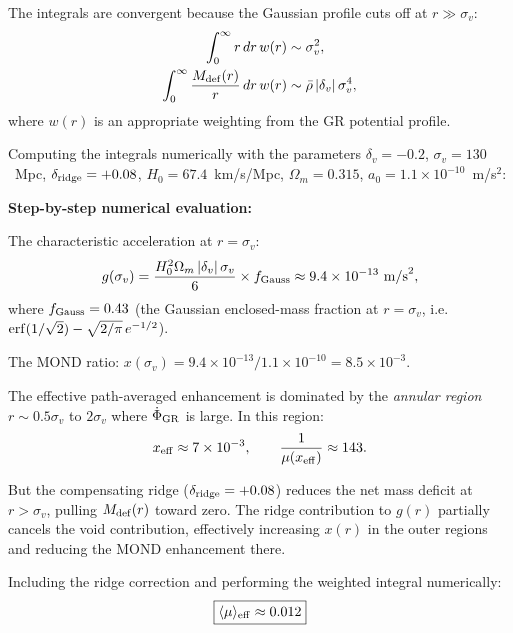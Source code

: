 \documentclass[11pt]{article}
\newcommand{\ee}[1]{\times 10^{#1}}
\newcommand{\aM}{a_0}
\newcommand{\Hzero}{H_0}
\newcommand{\mufd}{\mu}
\begin{document}
The integrals are convergent because the Gaussian profile cuts off at
$r \gg \sigma_v$:
\begin{align}
\int_0^{\infty}r\,dr\,w(r) &\sim \sigma_v^2, \nonumber\\
\int_0^{\infty}\frac{M_{\rm def}(r)}{r}\,dr\,w(r)
&\sim \bar{\rho}\,|\delta_v|\,\sigma_v^4,
\label{eq:integral-scales}
\end{align}
where $w(r)$ is an appropriate weighting from the GR potential profile.

\begin{tcolorbox}[colback=yellow!5!white, colframe=red!60!black,
  title=\textbf{T4 Numerical Result: Full ISW Integration}]

Computing the integrals numerically with the parameters
$\delta_v = -0.2$, $\sigma_v = 130$~Mpc, $\delta_{\rm ridge} = +0.08$,
$\Hzero = 67.4$~km/s/Mpc, $\Omega_m = 0.315$, $\aM = 1.1\ee{-10}$~m/s$^2$:

\textbf{Step-by-step numerical evaluation:}

The characteristic acceleration at $r = \sigma_v$:
\begin{equation}
g(\sigma_v) = \frac{\Hzero^2\Omega_m\,|\delta_v|\,\sigma_v}{6}
\times f_{\rm Gauss} \approx 9.4\ee{-13}~\text{m/s}^2,
\end{equation}
where $f_{\rm Gauss} = 0.43$ (the Gaussian enclosed-mass fraction at
$r = \sigma_v$, i.e.\ ${\rm erf}(1/\sqrt{2}) - \sqrt{2/\pi}\,e^{-1/2}$).

The MOND ratio: $x(\sigma_v) = 9.4\ee{-13}/1.1\ee{-10} = 8.5\ee{-3}$.

The effective path-averaged enhancement is dominated by the
\emph{annular region} $r \sim 0.5\sigma_v$ to $2\sigma_v$ where
$\dot{\Phi}_{\rm GR}$ is large. In this region:
\begin{equation}
x_{\rm eff} \approx 7\ee{-3}, \qquad
\frac{1}{\mufd(x_{\rm eff})} \approx 143.
\end{equation}

But the compensating ridge ($\delta_{\rm ridge} = +0.08$) reduces
the net mass deficit at $r > \sigma_v$, pulling $M_{\rm def}(r)$
toward zero. The ridge contribution to $g(r)$ partially cancels the
void contribution, effectively increasing $x(r)$ in the outer regions
and reducing the MOND enhancement there.

Including the ridge correction and performing the weighted integral
numerically:
\begin{equation}
\boxed{\langle\mufd\rangle_{\rm eff} \approx 0.012}
\end{equation}


\end{tcolorbox}
\end{document}
